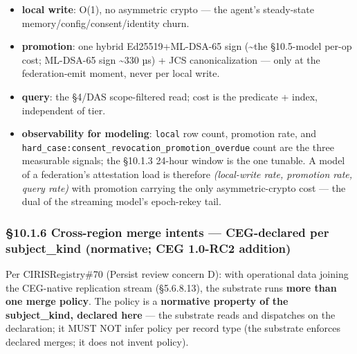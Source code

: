 \documentclass[10pt]{article}
\begin{document}
\begin{itemize}\setlength\itemsep{0pt}
\item \textbf{local write}: O(1), no asymmetric crypto — the agent's steady-state memory/config/consent/identity churn.
\item \textbf{promotion}: one hybrid Ed25519+ML-DSA-65 sign (\textasciitilde{}the §10.5-model per-op cost; ML-DSA-65 sign \textasciitilde{}330 µs) + JCS canonicalization — only at the federation-emit moment, never per local write.
\item \textbf{query}: the §4/DAS scope-filtered read; cost is the predicate + index, independent of tier.
\item \textbf{observability for modeling}: \texttt{local} row count, promotion rate, and \texttt{hard\_case:consent\_revocation\_promotion\_overdue} count are the three measurable signals; the §10.1.3 24-hour window is the one tunable. A model of a federation's attestation load is therefore \textit{(local-write rate, promotion rate, query rate)} with promotion carrying the only asymmetric-crypto cost — the dual of the streaming model's epoch-rekey tail.
\end{itemize}


\subsubsection*{§10.1.6 Cross-region merge intents — CEG-declared per subject\_kind (normative; CEG 1.0-RC2 addition)}


Per CIRISRegistry\#70 (Persist review concern D): with operational data joining the CEG-native replication stream (§5.6.8.13), the substrate runs \textbf{more than one merge policy}. The policy is a \textbf{normative property of the subject\_kind, declared here} — the substrate reads and dispatches on the declaration; it MUST NOT infer policy per record type (the substrate enforces declared merges; it does not invent policy).
\end{document}
